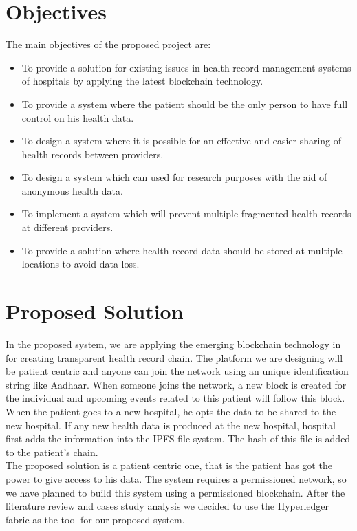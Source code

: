\documentclass[11pt]{report}
\begin{document}
\section{Objectives}  %

The main objectives of the proposed project are:

\begin{itemize}
        \item To provide a solution for existing issues in health record management systems of hospitals by applying the latest blockchain technology.
        \item To provide a system where the patient should be the only person to have full control on his health data.
        \item To design a system where it is possible for an effective and easier sharing of health records between providers.
        \item To design a system which can used for research purposes with the aid of anonymous health data.
        \item To implement a system which will prevent multiple fragmented health records at different providers.
        \item To provide a solution where health record data should be stored at multiple locations to avoid data loss.
    \end{itemize}


\newpage
\section{Proposed Solution} 

In the proposed system, we are applying  the emerging blockchain technology in for creating transparent health record chain. The platform we are designing will be patient centric and anyone can join the network using an unique identification string like Aadhaar. When someone joins the network, a new block is created for the individual and upcoming events related to this patient will follow this block. When the patient goes to a new hospital, he opts the data to be shared to the new hospital. If any new health data is produced at the new hospital, hospital first adds the information into the IPFS file system. The hash of this file is added to the patient's chain.
\\	The proposed solution is a patient centric one, that is the patient has got the power to give access to his data. The system requires a permissioned network, so we have planned to build this system using a permissioned blockchain. After the literature review and cases study analysis we decided to use the Hyperledger fabric as the tool for our proposed system.
\end{document}
